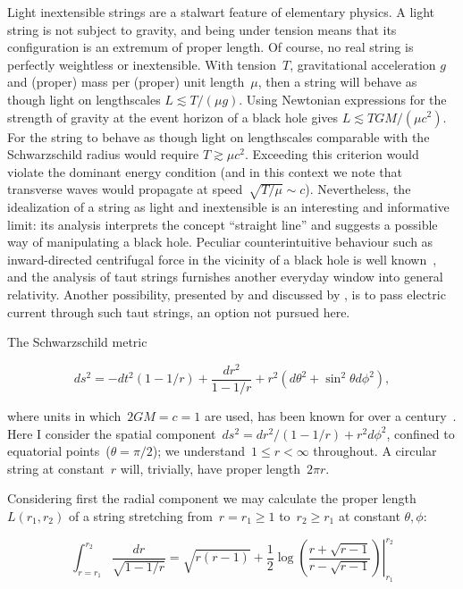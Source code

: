 \documentclass[prb,preprint]{revtex4-1}
\begin{document}
\label{intro}
Light inextensible strings are a stalwart feature of elementary
physics.  A light string is not subject to gravity, and being under
tension means that its configuration is an extremum of proper length.
Of course, no real string is perfectly weightless or inextensible.
With tension~$T$, gravitational acceleration $g$ and (proper) mass per
(proper) unit length~$\mu$, then a string will behave as though light
on lengthscales $L\lesssim T/\left(\mu g\right)$.  Using Newtonian
expressions for the strength of gravity at the event horizon of a
black hole gives $L\lesssim TGM/\left(\mu c^2\right)$.  For the string
to behave as though light on lengthscales comparable with the
Schwarzschild radius would require $T\gtrsim\mu c^2$.  Exceeding this
criterion would violate the dominant energy condition (and in this
context we note that transverse waves would propagate at
speed~$\sqrt{T/\mu}\sim c$).  Nevertheless, the idealization of a
string as light and inextensible is an interesting and informative
limit: its analysis interprets the concept ``straight line'' and
suggests a possible way of manipulating a black hole.  Peculiar
counterintuitive behaviour such as inward-directed centrifugal force
in the vicinity of a black hole is well
known~\citep{abramowicz1992,abramowicz1993}, and the analysis of taut
strings furnishes another everyday window into general relativity.
Another possibility, presented by \citet{damour1978} and discussed by
\citet{thorne1986}, is to pass electric current through such taut
strings, an option not pursued here.

The Schwarzschild metric

\begin{equation}\label{schwarzschild}
ds^2= -dt^2\left(1-1/r\right) +\frac{dr^2}{1-1/r} + r^2\left(d\theta^2 + \sin^2\theta d\phi^2\right),
\end{equation}

\noindent where units in which~$2GM=c=1$ are used, has been known for
over a century~\cite{schwarzschild1916}.  Here I consider the spatial
component~$ds^2= dr^2/\left(1-1/r\right) + r^2d\phi^2$, confined to
equatorial points~($\theta=\pi/2$); we understand~$1\leq r<\infty$
throughout.  A circular string at constant~$r$ will, trivially, have
proper length~$2\pi r$.

Considering first the radial component we may calculate the
proper length $L\left(r_1,r_2\right)$ of a string stretching
from~$r=r_1\geq 1$ to~$r_2\geq r_1$ at constant $\theta,\phi$:

\begin{equation}\label{radial_string_length}
  \int_{r=r_1}^{r_2}\frac{dr}{\sqrt{1-1/r}}=
  \left.
  \sqrt{r(r-1)} +\frac{1}{2}\log\left(
  \frac{r+\sqrt{r-1}}{r-\sqrt{r-1}}\right)
  \right|_{r_1}^{r_2}
  \end{equation}
\end{document}
